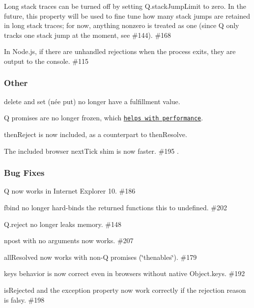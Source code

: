 \begin{DoxyItemize}
\item Long stack traces can be turned off by setting {\ttfamily Q.\+stack\+Jump\+Limit} to zero. In the future, this property will be used to fine tune how many stack jumps are retained in long stack traces; for now, anything nonzero is treated as one (since Q only tracks one stack jump at the moment, see \#144). \#168
\item In Node.\+js, if there are unhandled rejections when the process exits, they are output to the console. \#115
\end{DoxyItemize}

\subsubsection*{Other}


\begin{DoxyItemize}
\item {\ttfamily delete} and {\ttfamily set} (née {\ttfamily put}) no longer have a fulfillment value.
\item Q promises are no longer frozen, which \href{http://code.google.com/p/v8/issues/detail?id=1858}{\tt helps with performance}.
\item {\ttfamily then\+Reject} is now included, as a counterpart to {\ttfamily then\+Resolve}.
\item The included browser {\ttfamily next\+Tick} shim is now faster. \#195 .
\end{DoxyItemize}

\subsubsection*{Bug Fixes}


\begin{DoxyItemize}
\item Q now works in Internet Explorer 10. \#186 
\item {\ttfamily fbind} no longer hard-\/binds the returned function\textquotesingle{}s {\ttfamily this} to {\ttfamily undefined}. \#202
\item {\ttfamily Q.\+reject} no longer leaks memory. \#148
\item {\ttfamily npost} with no arguments now works. \#207
\item {\ttfamily all\+Resolved} now works with non-\/Q promises (\char`\"{}thenables\char`\"{}). \#179
\item {\ttfamily keys} behavior is now correct even in browsers without native {\ttfamily Object.\+keys}. \#192 
\item {\ttfamily is\+Rejected} and the {\ttfamily exception} property now work correctly if the rejection reason is falsy. \#198
\end{DoxyItemize}


